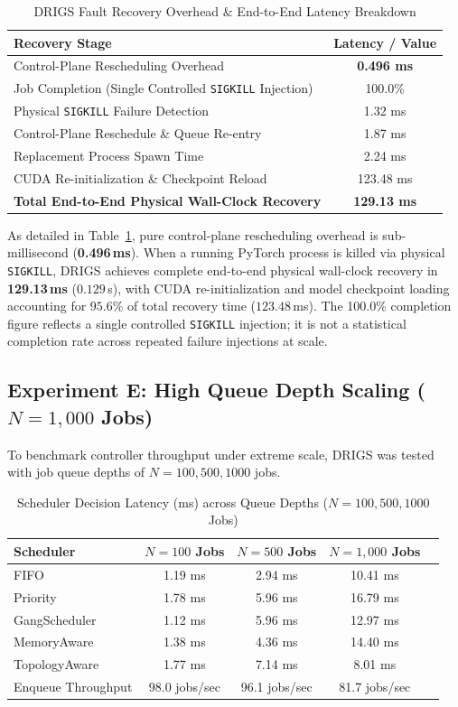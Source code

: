 \begin{table}[htbp]
\centering
\caption{DRIGS Fault Recovery Overhead \& End-to-End Latency Breakdown}
\label{tab:fault_recovery}
\begin{tabular}{lc}
\toprule
\textbf{Recovery Stage} & \textbf{Latency / Value} \\
\midrule
Control-Plane Rescheduling Overhead & \textbf{0.496 ms} \\
Job Completion (Single Controlled \texttt{SIGKILL} Injection) & 100.0\% \\
\midrule
Physical \texttt{SIGKILL} Failure Detection & 1.32 ms \\
Control-Plane Reschedule \& Queue Re-entry & 1.87 ms \\
Replacement Process Spawn Time & 2.24 ms \\
CUDA Re-initialization \& Checkpoint Reload & 123.48 ms \\
\textbf{Total End-to-End Physical Wall-Clock Recovery} & \textbf{129.13 ms} \\
\bottomrule
\end{tabular}
\end{table}

As detailed in Table~\ref{tab:fault_recovery}, pure control-plane rescheduling overhead is sub-millisecond (\textbf{0.496\,ms}). When a running PyTorch process is killed via physical \texttt{SIGKILL}, DRIGS achieves complete end-to-end physical wall-clock recovery in \textbf{129.13\,ms} ($0.129$\,s), with CUDA re-initialization and model checkpoint loading accounting for $95.6\%$ of total recovery time ($123.48$\,ms). The 100.0\% completion figure reflects a single controlled \texttt{SIGKILL} injection; it is not a statistical completion rate across repeated failure injections at scale.

\subsection{Experiment E: High Queue Depth Scaling ($N = 1,000$ Jobs)}
To benchmark controller throughput under extreme scale, DRIGS was tested with job queue depths of $N = 100, 500, 1000$ jobs.

\begin{table}[htbp]
\centering
\caption{Scheduler Decision Latency (ms) across Queue Depths ($N=100, 500, 1000$ Jobs)}
\label{tab:high_scale}
\begin{tabular}{lcccc}
\toprule
\textbf{Scheduler} & \textbf{$N=100$ Jobs} & \textbf{$N=500$ Jobs} & \textbf{$N=1,000$ Jobs} \\
\midrule
FIFO & 1.19 ms & 2.94 ms & 10.41 ms \\
Priority & 1.78 ms & 5.96 ms & 16.79 ms \\
GangScheduler & 1.12 ms & 5.96 ms & 12.97 ms \\
MemoryAware & 1.38 ms & 4.36 ms & 14.40 ms \\
TopologyAware & 1.77 ms & 7.14 ms & 8.01 ms \\
\midrule
Enqueue Throughput & 98.0 jobs/sec & 96.1 jobs/sec & 81.7 jobs/sec \\
\bottomrule
\end{tabular}
\end{table}

